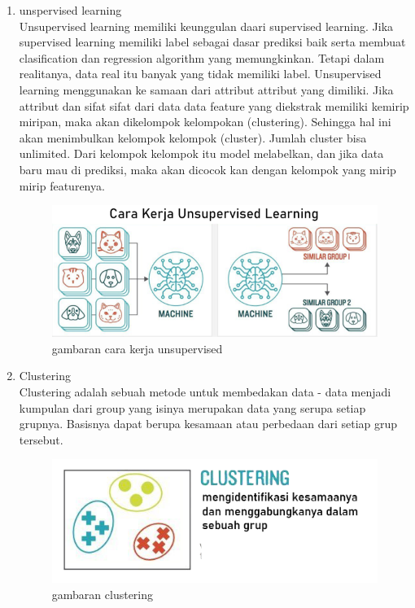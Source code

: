 \begin{enumerate}
\item unspervised learning
\hfill\\
Unsupervised learning memiliki keunggulan daari supervised learning. Jika supervised learning memiliki label sebagai dasar prediksi baik serta membuat clasification dan regression algorithm yang memungkinkan. Tetapi dalam realitanya, data real itu banyak yang tidak memiliki label. Unsupervised learning menggunakan ke samaan dari attribut attribut yang dimiliki. Jika attribut dan sifat sifat dari data data feature yang diekstrak memiliki kemirip miripan, maka akan dikelompok kelompokan (clustering). Sehingga hal ini akan menimbulkan kelompok kelompok (cluster). Jumlah cluster bisa unlimited. Dari kelompok kelompok itu model melabelkan, dan jika data baru mau di prediksi, maka akan dicocok kan dengan kelompok yang mirip mirip featurenya.
\begin{figure}[H]
    \includegraphics[width=12cm]{figures/1174083/figures2/3.png}
    \centering
    \caption{gambaran cara kerja unsupervised}
\end{figure}

\item Clustering 
\hfill\\
Clustering adalah sebuah metode untuk membedakan data - data menjadi kumpulan dari group yang isinya merupakan data yang serupa setiap grupnya. Basisnya dapat berupa kesamaan atau perbedaan dari setiap grup tersebut.
\begin{figure}[H]
    \includegraphics[width=12cm]{figures/1174083/figures2/4.png}
    \centering
    \caption{gambaran clustering}
\end{figure}
\end{enumerate}
